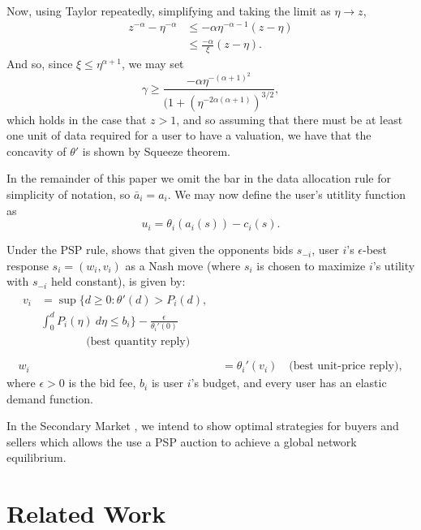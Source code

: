 \documentclass[12pt]{article}
\theoremstyle{definition}
\begin{document}
\begin{multicols}{2}
\begin{itemize}
\begin{align*}
\end{align*}
Now, using Taylor repeatedly, simplifying and taking the limit as $\eta \rightarrow z$,
\begin{align*}
    z^{-\alpha} - \eta^{-\alpha} &\le -\alpha\eta^{-\alpha-1}(z-\eta) \\
    & \le \frac{-\alpha}{\xi}(z-\eta).
\end{align*}
And so, since $\xi \le \eta^{\alpha+1}$,
we may set
$$
    \gamma \ge
\frac{-\alpha\eta^{-(\alpha+1)^2}}{\big(1+(\eta^{-2\alpha(\alpha+1)})^{3/2}},
$$
which holds in the case that $z > 1$, and so assuming that there must be at least one
unit of data required for a user to have
a valuation,  we have that the concavity of $\theta'$ is shown by Squeeze theorem.
\end{itemize}

In the remainder of this paper we omit the bar in the data allocation rule for
simplicity of notation, so $\bar{a}_i = a_i$. We may now define the user's utitlity function as
\begin{equation}\label{buyerutility}
    u_i = \theta_i(a_i(s)) - c_i(s).
\end{equation}

Under the PSP rule, \cite{lazar} shows that given the opponents bids $s_{-i}$,
user $i$'s $\epsilon$-best response $s_i = (w_i, v_i)$ as a Nash move
(where $s_i$ is chosen to maximize $i$'s utility with $s_{-i}$ held constant), is
given by:
\begin{align}
\begin{split}
    v_i &= \sup\bigg\lbrace d \ge 0 : \theta '(d) > P_i(d), \\ 
&\displaystyle\int_0^d P_i(\eta) \ d\eta \le b_i\bigg\rbrace -
\frac{\epsilon}{\theta_i'(0)} \\
&\qquad\qquad \text{(best quantity reply)} \\
\end{split}\\
    w_i &= \theta_i'(v_i) \quad \text{(best unit-price reply)},
\end{align}
where $\epsilon > 0$ is the bid fee, $b_i$ is user $i$'s budget, and every user
has an elastic demand function.

In the Secondary Market \cite{zheng}, we intend to show optimal strategies for
buyers and sellers which allows the use a PSP auction to achieve a global
network equilibrium.

\section{Related Work}


\end{multicols}
\end{document}
